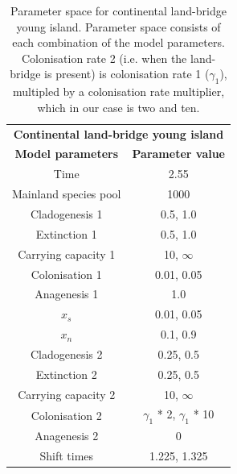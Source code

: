 \begin{table}[ht]
    \centering
    \caption{Parameter space for continental land-bridge young island. Parameter space consists of each combination of the model parameters. Colonisation rate 2 (i.e. when the land-bridge is present) is colonisation rate 1 ($\gamma_1$), multipled by a colonisation rate multiplier, which in our case is two and ten.}
    \begin{tabular}{ c | c }
        \multicolumn{2}{c}{\textbf{Continental land-bridge young island}} \\
        \textbf{Model parameters} & \textbf{Parameter value} \\ 
        \hline
        \hline
        Time & 2.55 \\
        \hline
        Mainland species pool & 1000 \\
        \hline
        Cladogenesis 1 & 0.5, 1.0 \\
        \hline
        Extinction 1 & 0.5, 1.0 \\
        \hline
        Carrying capacity 1 & 10, $\infty$ \\
        \hline
        Colonisation 1 & 0.01, 0.05 \\
        \hline
        Anagenesis 1 & 1.0 \\
        \hline
        $x_s$ & 0.01, 0.05 \\
        \hline
        $x_n$ & 0.1, 0.9 \\
        \hline
        Cladogenesis 2 & 0.25, 0.5 \\
        \hline
        Extinction 2 & 0.25, 0.5 \\
        \hline
        Carrying capacity 2 & 10, $\infty$ \\
        \hline
        Colonisation 2 & $\gamma_1$ * 2, $\gamma_1$ * 10 \\ 
        \hline 
        Anagenesis 2 & 0 \\
        \hline
        Shift times & 1.225, 1.325 \\
    \end{tabular}
    \label{tab:continental_lb_young}
\end{table}


